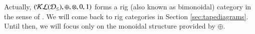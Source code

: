 Actually, $ (\mathcal{KL}(\mathcal{D}_{\leq}), \oplus, \otimes, 0, 1)$ forms a rig (also known as bimonoidal) category in the sense of \cite{laplaza_coherence_1972}. We will come back to rig categories in Section \ref{sec:tapediagrams}. Until then, we will focus only on the monoidal structure provided by $\oplus$. 
%


